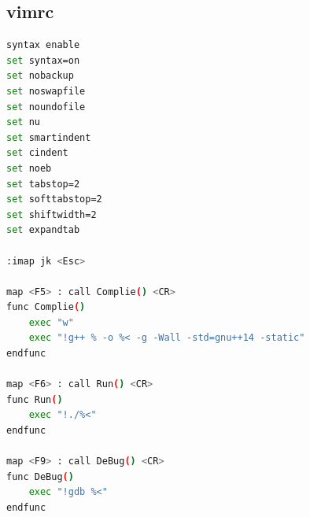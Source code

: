 \documentclass[twoside]{article}
\begin{document}
\subsection{vimrc}
\begin{lstlisting}[language=sh]
syntax enable
set syntax=on
set nobackup
set noswapfile
set noundofile
set nu
set smartindent
set cindent
set noeb
set tabstop=2
set softtabstop=2
set shiftwidth=2
set expandtab

:imap jk <Esc>

map <F5> : call Complie() <CR>
func Complie()
	exec "w"
	exec "!g++ % -o %< -g -Wall -std=gnu++14 -static"
endfunc

map <F6> : call Run() <CR>
func Run()
	exec "!./%<"
endfunc

map <F9> : call DeBug() <CR>
func DeBug()
	exec "!gdb %<"
endfunc

\end{lstlisting}
\end{document}
